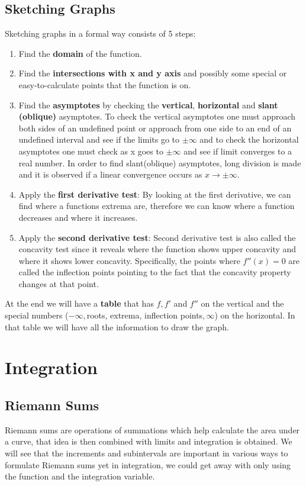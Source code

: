 \documentclass[12pt]{article}
\begin{document}
\subsection{Sketching Graphs}
Sketching graphs in a formal way consists of 5 steps:
\begin{enumerate}
\item Find the \textbf{domain} of the function.
\item Find the \textbf{intersections with x and y axis} and possibly some special or easy-to-calculate points that the function is on.
\item Find the \textbf{asymptotes} by checking the \textbf{vertical}, \textbf{horizontal} and \textbf{slant (oblique)} asymptotes. To check the vertical asymptotes one must approach both sides of an undefined point or approach from one side to an end of an undefined interval and see if the limits go to $\pm \infty$ and to check the horizontal asymptotes one must check as x goes to $\pm \infty $ and see if limit converges to a real number. In order to find slant(oblique) asymptotes, long division is made and it is observed if a linear convergence occurs as $x \to \pm\infty$.
\item Apply the \textbf{first derivative test}: By looking at the first derivative, we can find where a functions extrema are, therefore we can know where a function decreases and where it increases. 
\item Apply the \textbf{second derivative test}: Second derivative test is also called the concavity test since it reveals where the function shows upper concavity and where it shows lower concavity. Specifically, the points where $f''(x)=0$ are called the inflection points pointing to the fact that the concavity property changes at that point.
\end{enumerate}
At the end we will have a \textbf{table} that has $f,f'$ and $f''$ on the vertical and the special numbers ($-\infty , $roots, extrema, inflection points$,\infty $) on the horizontal. In that table we will have all the information to draw the graph.
\newpage
\section{Integration}
\subsection{Riemann Sums}
Riemann sums are operations of summations which help calculate the area under a curve, that idea is then combined with limits and integration is obtained. We will see that the increments and subintervals are important in various ways to formulate Riemann sums yet in integration, we could get away with only using the function and the integration variable.
\end{document}
